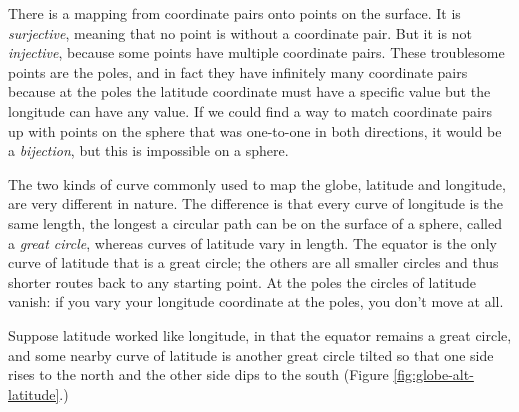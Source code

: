 There is a mapping from coordinate pairs onto points on the surface. It is \textit{surjective}, meaning that no point is without a coordinate pair. But it is not \textit{injective}, because some points have multiple coordinate pairs. These troublesome points are the poles, and in fact they have infinitely many coordinate pairs because at the poles the latitude coordinate must have a specific value but the longitude can have any value. If we could find a way to match coordinate pairs up with points on the sphere that was one-to-one in both directions, it would be a \textit{bijection}, but this is impossible on a sphere.

The two kinds of curve commonly used to map the globe, latitude and longitude, are very different in nature. The difference is that every curve of longitude is the same length, the longest a circular path can be on the surface of a sphere, called a \textit{great circle}, whereas curves of latitude vary in length. The equator is the only curve of latitude that is a great circle; the others are all smaller circles and thus shorter routes back to any starting point. At the poles the circles of latitude vanish: if you vary your longitude coordinate at the poles, you don't move at all.

Suppose latitude worked like longitude, in that the equator remains a great circle, and some nearby curve of latitude is another great circle tilted so that one side rises to the north and the other side dips to the south (Figure \ref{fig:globe-alt-latitude}.)

